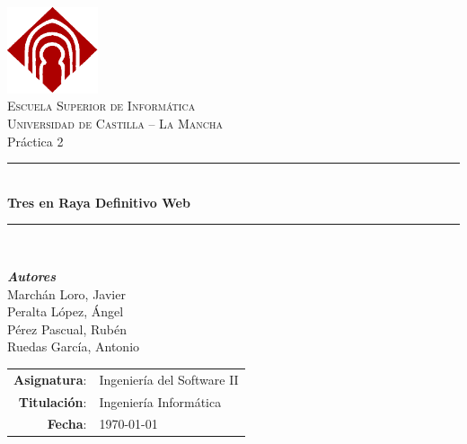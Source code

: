 \documentclass[a4paper,11pt,oneside]{article}
\begin{document}


\begin{titlepage}
\begin{center}

\includegraphics[width=0.2\textwidth]{img/logo-uclm.png}\\[1cm]
\textsc{\LARGE Escuela Superior de Informática}\\[0.5cm]
\textsc{\Large Universidad de Castilla -- La Mancha}\\[2.5cm]

{\LARGE Práctica 2}\\[0.5cm]
\rule{\linewidth}{0.5mm}\\[0.4cm]
{\huge \textbf{Tres en Raya Definitivo Web}}\\
\rule{\linewidth}{0.5mm}\\[0.4cm]

\begin{minipage}{0.5\textwidth}
\begin{flushleft}
\large
\hspace{1cm}\textbf{\emph{Autores}}\\
Marchán Loro, Javier\\
Peralta López, Ángel\\
Pérez Pascual, Rubén\\
Ruedas García, Antonio\\
\end{flushleft}
\end{minipage}
\vfill

\begin{minipage}{\textwidth}
\large
\begin{tabular}{rl}
\textbf{Asignatura}: & Ingeniería del Software II\\
\textbf{Titulación}: & Ingeniería Informática\\
\textbf{Fecha}: & \today
\end{tabular}
\end{minipage}

\end{center}
\end{titlepage}
\end{document}
